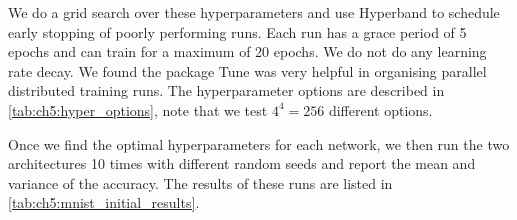 We do a grid search over these hyperparameters and use Hyperband
\cite{li_hyperband:_2016} to schedule early stopping of poorly performing runs.
Each run has a grace period of 5 epochs and can train for a maximum of 20
epochs. We do not do any learning rate decay.  We found the package Tune \cite{liaw2018tune}
was very helpful in organising parallel distributed training runs.  
The hyperparameter options are described in
\autoref{tab:ch5:hyper_options}, note that we test $4^4=256$ different options.

Once we find the optimal hyperparameters for each network, we then run the two
architectures 10 times with different random seeds and report the mean and variance of
the accuracy. The results of these runs are listed in
\autoref{tab:ch5:mnist_initial_results}.

